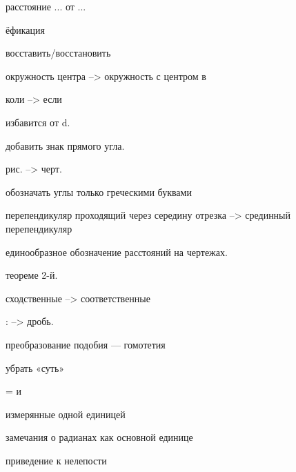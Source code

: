 расстояние ... от ...

ёфикация

восставить/восстановить

окружность центра --> окружность с центром в

коли --> если

избавится от d.

добавить знак прямого угла.

рис. --> черт.

обозначать углы только греческими буквами

перепендикуляр проходящий через середину отрезка --> срединный перепендикуляр

единообразное обозначение расстояний на чертежах.

теореме 2-й.

сходственные --> соответственные

: --> дробь.

преобразование подобия --- гомотетия

убрать «суть»

= и \approx

измерянные одной единицей

замечания о радианах как основной единице

приведение к нелепости